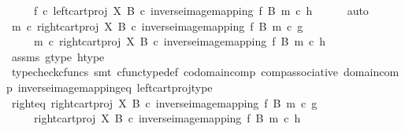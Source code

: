 \begin{isabellebody}
\ \ \ \ {\isacharequal}{\kern0pt}\ f\ {\isasymcirc}\isactrlsub c\ {\isacharparenleft}{\kern0pt}left{\isacharunderscore}{\kern0pt}cart{\isacharunderscore}{\kern0pt}proj\ X\ B\ {\isasymcirc}\isactrlsub c\ inverse{\isacharunderscore}{\kern0pt}image{\isacharunderscore}{\kern0pt}mapping\ f\ B\ m{\isacharparenright}{\kern0pt}\ {\isasymcirc}\isactrlsub c\ h{\isachardoublequoteclose}\isanewline
\ \ \ \ \isamarkupfalse%
\ auto\isanewline
\ \ \isamarkupfalse%
\ \isamarkupfalse%
\ {\isachardoublequoteopen}m\ {\isasymcirc}\isactrlsub c\ {\isacharparenleft}{\kern0pt}right{\isacharunderscore}{\kern0pt}cart{\isacharunderscore}{\kern0pt}proj\ X\ B\ {\isasymcirc}\isactrlsub c\ inverse{\isacharunderscore}{\kern0pt}image{\isacharunderscore}{\kern0pt}mapping\ f\ B\ m{\isacharparenright}{\kern0pt}\ {\isasymcirc}\isactrlsub c\ g\isanewline
\ \ \ \ {\isacharequal}{\kern0pt}\ m\ {\isasymcirc}\isactrlsub c\ {\isacharparenleft}{\kern0pt}right{\isacharunderscore}{\kern0pt}cart{\isacharunderscore}{\kern0pt}proj\ X\ B\ {\isasymcirc}\isactrlsub c\ inverse{\isacharunderscore}{\kern0pt}image{\isacharunderscore}{\kern0pt}mapping\ f\ B\ m{\isacharparenright}{\kern0pt}\ {\isasymcirc}\isactrlsub c\ h{\isachardoublequoteclose}\isanewline
\ \ \ \ \isamarkupfalse%
\ assms\ g{\isacharunderscore}{\kern0pt}type\ h{\isacharunderscore}{\kern0pt}type\isanewline
\ \ \ \ \isamarkupfalse%
\ {\isacharparenleft}{\kern0pt}typecheck{\isacharunderscore}{\kern0pt}cfuncs{\isacharcomma}{\kern0pt}\ smt\ cfunc{\isacharunderscore}{\kern0pt}type{\isacharunderscore}{\kern0pt}def\ codomain{\isacharunderscore}{\kern0pt}comp\ comp{\isacharunderscore}{\kern0pt}associative\ domain{\isacharunderscore}{\kern0pt}comp\ inverse{\isacharunderscore}{\kern0pt}image{\isacharunderscore}{\kern0pt}mapping{\isacharunderscore}{\kern0pt}eq\ left{\isacharunderscore}{\kern0pt}cart{\isacharunderscore}{\kern0pt}proj{\isacharunderscore}{\kern0pt}type{\isacharparenright}{\kern0pt}\ \isanewline
\ \ \isamarkupfalse%
\ \isamarkupfalse%
\ right{\isacharunderscore}{\kern0pt}eq{\isacharcolon}{\kern0pt}\ {\isachardoublequoteopen}{\isacharparenleft}{\kern0pt}right{\isacharunderscore}{\kern0pt}cart{\isacharunderscore}{\kern0pt}proj\ X\ B\ {\isasymcirc}\isactrlsub c\ inverse{\isacharunderscore}{\kern0pt}image{\isacharunderscore}{\kern0pt}mapping\ f\ B\ m{\isacharparenright}{\kern0pt}\ {\isasymcirc}\isactrlsub c\ g\isanewline
\ \ \ \ {\isacharequal}{\kern0pt}\ {\isacharparenleft}{\kern0pt}right{\isacharunderscore}{\kern0pt}cart{\isacharunderscore}{\kern0pt}proj\ X\ B\ {\isasymcirc}\isactrlsub c\ inverse{\isacharunderscore}{\kern0pt}image{\isacharunderscore}{\kern0pt}mapping\ f\ B\ m{\isacharparenright}{\kern0pt}\ {\isasymcirc}\isactrlsub c\ h{\isachardoublequoteclose}\isanewline

\end{isabellebody}
